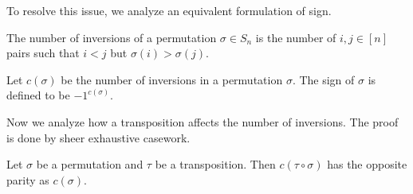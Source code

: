 To resolve this issue, we analyze an equivalent formulation of sign.

\begin{definition}
   The number of inversions of a permutation $\sigma\in S_n$ is the number of $i,j\in[n]$ pairs such that $i<j$ but $\sigma(i)>\sigma(j)$.
\end{definition}

\begin{definition}
    Let $c(\sigma)$ be the number of inversions in a permutation $\sigma$. The sign of $\sigma$ is defined to be $-1^{c(\sigma)}$.
\end{definition}

Now we analyze how a transposition affects the number of inversions. The proof is done by sheer exhaustive casework.

\begin{theorem}
    Let $\sigma$ be a permutation and $\tau$ be a transposition. Then $c(\tau\circ\sigma)$ has the opposite parity as $c(\sigma)$.
\end{theorem}
